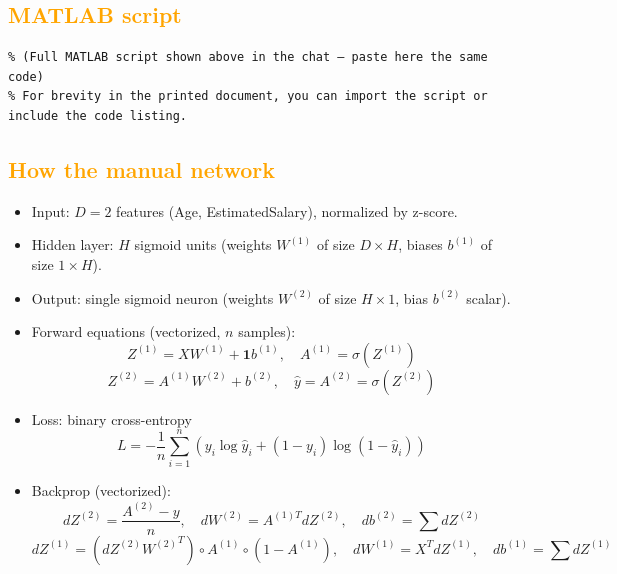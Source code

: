 \documentclass[11pt,a4paper]{article}
\begin{document}
\subsection{\textcolor{orange}{MATLAB script}}

\begin{lstlisting}
% (Full MATLAB script shown above in the chat — paste here the same code)
% For brevity in the printed document, you can import the script or include the code listing.
\end{lstlisting}

\subsection{\textcolor{orange}{How the manual network }}
\begin{itemize}
  \item Input: $D=2$ features (Age, EstimatedSalary), normalized by z-score.
  \item Hidden layer: $H$ sigmoid units (weights $W^{(1)}$ of size $D\times H$, biases $b^{(1)}$ of size $1\times H$).
  \item Output: single sigmoid neuron (weights $W^{(2)}$ of size $H\times 1$, bias $b^{(2)}$ scalar).
  \item Forward equations (vectorized, $n$ samples):
    \[
      Z^{(1)} = X W^{(1)} + \mathbf{1} {b^{(1)}},\quad
      A^{(1)} = \sigma(Z^{(1)})
    \]
    \[
      Z^{(2)} = A^{(1)} W^{(2)} + b^{(2)},\quad
      \hat{y} = A^{(2)} = \sigma(Z^{(2)})
    \]
  \item Loss: binary cross-entropy
    \[
      L = -\frac{1}{n}\sum_{i=1}^n \left( y_i\log \hat{y}_i + (1-y_i)\log(1-\hat{y}_i) \right)
    \]
  \item Backprop (vectorized):
    \[
      dZ^{(2)} = \frac{A^{(2)}-y}{n},\quad dW^{(2)} = A^{(1)T} dZ^{(2)},\quad db^{(2)} = \sum dZ^{(2)}
    \]
    \[
      dZ^{(1)} = (dZ^{(2)} {W^{(2)}}^T) \circ A^{(1)}\circ(1-A^{(1)}),\quad dW^{(1)} = X^T dZ^{(1)},\quad db^{(1)}=\sum dZ^{(1)}
    \]
\end{itemize}
\end{document}
